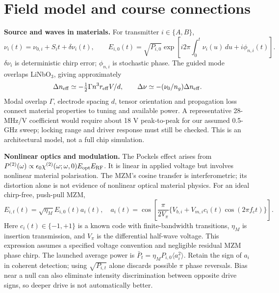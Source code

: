 \documentclass[10pt,letterpaper]{article}
\begin{document}
\section{Field model and course connections}
\textbf{Source and waves in materials.} For transmitter $i\in\{A,B\}$,
\begin{equation}
\nu_i(t)=\nu_{0,i}+S_it+\delta\nu_i(t),\qquad
E_{i,0}(t)=\sqrt{P_{i,0}}\exp\!\left[i2\pi\int_0^t\nu_i(u)\,du+i\phi_{n,i}(t)\right].
\end{equation}
$\delta\nu_i$ is deterministic chirp error; $\phi_{n,i}$ is stochastic phase. The guided mode overlaps LiNbO$_3$, giving approximately
\begin{equation}
\Delta n_{\rm eff}\simeq-\tfrac12\Gamma n^3r_{\rm eff}V/d,\qquad
\Delta\nu\simeq-(\nu_0/n_g)\Delta n_{\rm eff}.
\end{equation}
Modal overlap $\Gamma$, electrode spacing $d$, tensor orientation and propagation loss connect material properties to tuning and available power. A representative 28-MHz/V coefficient \cite{snigirev} would require about 18 V peak-to-peak for our assumed 0.5-GHz sweep; locking range and driver response must still be checked. This is an architectural model, not a full chip simulation.

\textbf{Nonlinear optics and modulation.} The Pockels effect arises from $P^{(2)}(\omega)\propto\epsilon_0\chi^{(2)}(\omega;\omega,0)E_{\rm opt}E_{\rm RF}$. It is linear in applied voltage but involves nonlinear material polarisation. The MZM's cosine transfer is interferometric; its distortion alone is not evidence of nonlinear optical material physics. For an ideal chirp-free, push-pull MZM,
\begin{equation}
E_{i,t}(t)=\sqrt{\eta_M}E_{i,0}(t)a_i(t),\quad
 a_i(t)=\cos\!\left[\frac{\pi}{2V_\pi}\{V_{b,i}+V_{m,i}c_i(t)\cos(2\pi f_ct)\}\right].
\end{equation}
Here $c_i(t)\in\{-1,+1\}$ is a known code with finite-bandwidth transitions, $\eta_M$ is insertion transmission, and $V_\pi$ is the differential half-wave voltage. This expression assumes a specified voltage convention and negligible residual MZM phase chirp. The launched average power is $\bar P_t=\eta_M P_{i,0}\langle a_i^2\rangle$. Retain the sign of $a_i$ in coherent detection; using $\sqrt{P_{i,t}}$ alone discards possible $\pi$ phase reversals. Bias near a null can also eliminate intensity discrimination between opposite drive signs, so deeper drive is not automatically better.
\end{document}
